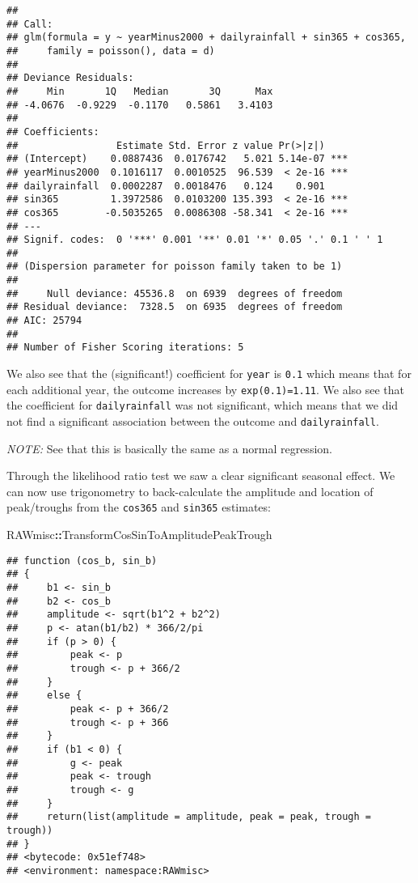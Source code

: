 \documentclass[]{book}
\newenvironment{Shaded}{\begin{snugshade}}{\end{snugshade}}
\newcommand{\OperatorTok}[1]{\textcolor[rgb]{0.81,0.36,0.00}{\textbf{#1}}}
\newcommand{\NormalTok}[1]{#1}
\begin{document}
\begin{verbatim}
## 
## Call:
## glm(formula = y ~ yearMinus2000 + dailyrainfall + sin365 + cos365, 
##     family = poisson(), data = d)
## 
## Deviance Residuals: 
##     Min       1Q   Median       3Q      Max  
## -4.0676  -0.9229  -0.1170   0.5861   3.4103  
## 
## Coefficients:
##                 Estimate Std. Error z value Pr(>|z|)    
## (Intercept)    0.0887436  0.0176742   5.021 5.14e-07 ***
## yearMinus2000  0.1016117  0.0010525  96.539  < 2e-16 ***
## dailyrainfall  0.0002287  0.0018476   0.124    0.901    
## sin365         1.3972586  0.0103200 135.393  < 2e-16 ***
## cos365        -0.5035265  0.0086308 -58.341  < 2e-16 ***
## ---
## Signif. codes:  0 '***' 0.001 '**' 0.01 '*' 0.05 '.' 0.1 ' ' 1
## 
## (Dispersion parameter for poisson family taken to be 1)
## 
##     Null deviance: 45536.8  on 6939  degrees of freedom
## Residual deviance:  7328.5  on 6935  degrees of freedom
## AIC: 25794
## 
## Number of Fisher Scoring iterations: 5
\end{verbatim}

We also see that the (significant!) coefficient for \texttt{year} is
\texttt{0.1} which means that for each additional year, the outcome
increases by \texttt{exp(0.1)=1.11}. We also see that the coefficient
for \texttt{dailyrainfall} was not significant, which means that we did
not find a significant association between the outcome and
\texttt{dailyrainfall}.

\emph{NOTE:} See that this is basically the same as a normal regression.

Through the likelihood ratio test we saw a clear significant seasonal
effect. We can now use trigonometry to back-calculate the amplitude and
location of peak/troughs from the \texttt{cos365} and \texttt{sin365}
estimates:

\begin{Shaded}
\begin{Highlighting}[]
\NormalTok{RAWmisc}\OperatorTok{::}\NormalTok{TransformCosSinToAmplitudePeakTrough}
\end{Highlighting}
\end{Shaded}

\begin{verbatim}
## function (cos_b, sin_b) 
## {
##     b1 <- sin_b
##     b2 <- cos_b
##     amplitude <- sqrt(b1^2 + b2^2)
##     p <- atan(b1/b2) * 366/2/pi
##     if (p > 0) {
##         peak <- p
##         trough <- p + 366/2
##     }
##     else {
##         peak <- p + 366/2
##         trough <- p + 366
##     }
##     if (b1 < 0) {
##         g <- peak
##         peak <- trough
##         trough <- g
##     }
##     return(list(amplitude = amplitude, peak = peak, trough = trough))
## }
## <bytecode: 0x51ef748>
## <environment: namespace:RAWmisc>
\end{verbatim}
\end{document}
